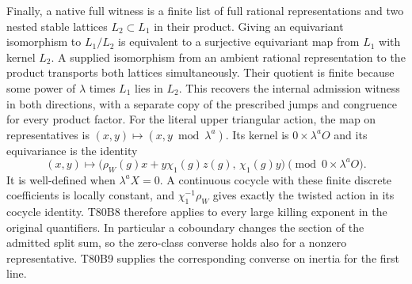 Finally, a native full witness is a finite list of full rational
representations and two nested stable lattices $L_2\subset L_1$ in
their product. Giving an equivariant isomorphism to $L_1/L_2$ is
equivalent to a surjective equivariant map from $L_1$ with kernel $L_2$.
A supplied isomorphism from an ambient rational representation to the
product transports both lattices simultaneously. Their quotient is
finite because some power of $\lambda$ times $L_1$ lies in $L_2$.
This recovers the internal admission witness in both directions, with a
separate copy of the prescribed jumps and congruence for every product
factor. For the literal upper triangular action, the map on
representatives is $(x,y)\mapsto(x,y\bmod\lambda^a)$. Its kernel
is $0\times\lambda^aO$ and its equivariance is the identity
\[
 (x,y)\longmapsto
  \big(\rho_W(g)x+y\chi_1(g)z(g),\,\chi_1(g)y\big)
                       \pmod{0\times\lambda^aO} .
\]
It is well-defined when $\lambda^aX=0$. A continuous cocycle with
these finite discrete coefficients is locally constant, and
$\chi_1^{-1}\rho_W$ gives exactly the twisted action in its cocycle
identity. T80B8 therefore applies to every large killing exponent in
the original quantifiers. In particular a coboundary changes the
section of the admitted split sum, so the zero-class converse holds
also for a nonzero representative. T80B9 supplies the corresponding
converse on inertia for the first line.
